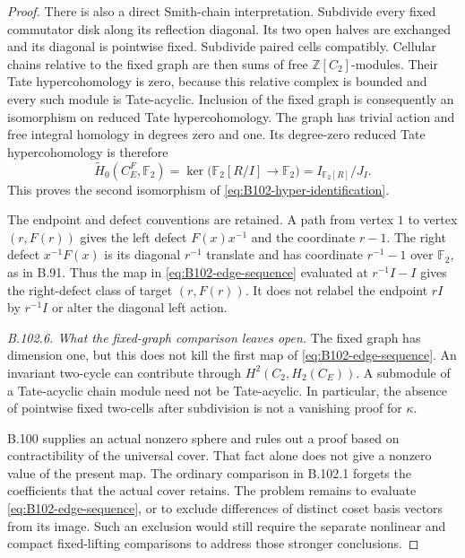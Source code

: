 \begin{proof}
There is also a direct Smith-chain interpretation. Subdivide every
fixed commutator disk along its reflection diagonal. Its two open
halves are exchanged and its diagonal is pointwise fixed. Subdivide
paired cells compatibly. Cellular chains relative to the fixed
graph are then sums of free $\mathbb Z[C_2]$-modules. Their Tate
hypercohomology is zero, because this relative complex is bounded
and every such module is Tate-acyclic. Inclusion of the fixed
graph is consequently an isomorphism on reduced Tate
hypercohomology. The graph has trivial action and free integral
homology in degrees zero and one. Its degree-zero reduced Tate
hypercohomology is therefore
\[
 \widetilde H_0(C_E^F,\mathbb F_2)
   =\ker\bigl(\mathbb F_2[R/I]\to\mathbb F_2\bigr)
   =I_{\mathbb F_2[R]}/J_I.
\]
This proves the second isomorphism of
\eqref{eq:B102-hyper-identification}.

The endpoint and defect conventions are retained. A path from
vertex $1$ to vertex $(r,F(r))$ gives the left defect
$F(x)x^{-1}$ and the coordinate $r-1$. The right defect
$x^{-1}F(x)$ is its diagonal $r^{-1}$ translate and has coordinate
$r^{-1}-1$ over $\mathbb F_2$, as in B.91. Thus the map in
\eqref{eq:B102-edge-sequence} evaluated at $r^{-1}I-I$ gives the
right-defect class of target $(r,F(r))$. It does not relabel the
endpoint $rI$ by $r^{-1}I$ or alter the diagonal left action.

\emph{B.102.6. What the fixed-graph comparison leaves open.}
The fixed graph has dimension one, but this does not kill the
first map of \eqref{eq:B102-edge-sequence}. An invariant two-cycle
can contribute through $H^2(C_2,H_2(C_E))$. A submodule of a
Tate-acyclic chain module need not be Tate-acyclic. In particular,
the absence of pointwise fixed two-cells after subdivision is not
a vanishing proof for $\kappa$.

B.100 supplies an actual nonzero sphere and rules out a proof
based on contractibility of the universal cover. That fact alone
does not give a nonzero value of the present map. The ordinary
comparison in B.102.1 forgets the coefficients that the actual
cover retains. The problem remains to evaluate
\eqref{eq:B102-edge-sequence}, or to exclude differences of
distinct coset basis vectors from its image. Such an exclusion
would still require the separate nonlinear and compact
fixed-lifting comparisons to address those stronger conclusions.


\end{proof}
